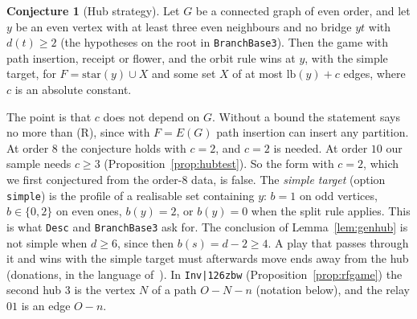 \documentclass[11pt]{amsart}
\theoremstyle{definition}
\newtheorem{conjecture}[theorem]{Conjecture}
\begin{document}
\begin{conjecture}[Hub strategy]\label{conj:hub}
Let $G$ be a connected graph of even order, and let $y$ be an even vertex with at least three
even neighbours and no bridge $yt$ with $d(t)\ge2$ (the hypotheses on the root in
\texttt{BranchBase3}). Then the game with path insertion, receipt or flower, and the orbit rule
wins at $y$, with the simple target, for $F=\mathrm{star}(y)\cup X$ and some set $X$ of at most
$\mathrm{lb}(y)+c$ edges, where $c$ is an absolute constant.
\end{conjecture}
The point is that $c$ does not depend on $G$. Without a bound the statement says no more than
(R), since with $F=E(G)$ path insertion can insert any partition. At order $8$ the conjecture holds with $c=2$,
and $c=2$ is needed. At order $10$ our sample needs $c\ge3$
(Proposition~\ref{prop:hubtest}). So the form with $c=2$, which we first conjectured from the
order-$8$ data, is false.
The \emph{simple target} (option \texttt{simple}) is the profile of a realisable set containing
$y$: $b=1$ on odd vertices, $b\in\{0,2\}$ on even ones, $b(y)=2$, or $b(y)=0$ when the split rule
applies. This is what \texttt{Desc} and \texttt{BranchBase3} ask for. The conclusion of
Lemma~\ref{lem:genhub} is not simple when $d\ge6$, since then $b(s)=d-2\ge4$. A play that passes
through it and wins with the simple target must afterwards move ends away from the hub
(donations, in the language of~\cite{D6}). In
\texttt{Inv|\char126zbw} (Proposition~\ref{prop:rfgame}) the second hub $3$ is the vertex
$N$ of a path $O\!-\!N\!-\!n$ (notation below), and the relay $01$ is an edge $O\!-\!n$.
\end{document}
